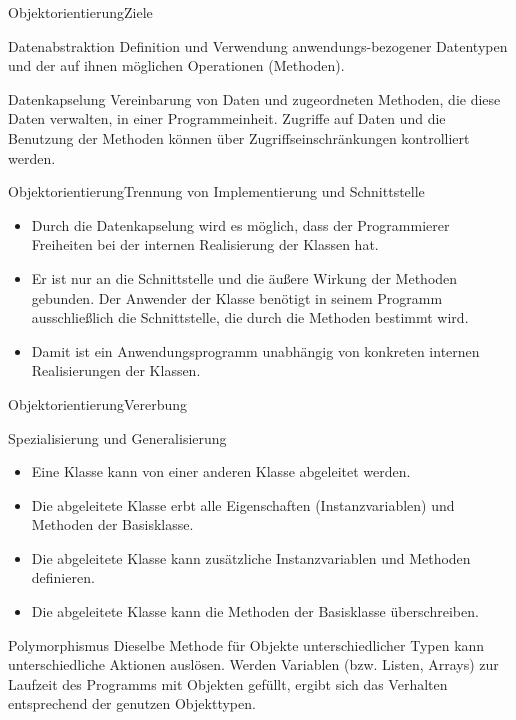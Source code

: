 \documentclass[xelatex,aspectratio=169]{beamer}
\begin{document}
\begin{frame}{Objektorientierung}{Ziele}
    \begin{block}{Datenabstraktion}
        Definition und Verwendung anwendungs-bezogener Datentypen und der auf ihnen möglichen Operationen (Methoden).
    \end{block}
    \begin{block}{Datenkapselung}
        Vereinbarung von Daten  und zugeordneten Methoden, die diese Daten verwalten, in einer Programmeinheit.
        Zugriffe auf Daten und die Benutzung der Methoden können über Zugriffseinschränkungen kontrolliert werden.
    \end{block}
\end{frame}

\begin{frame}{Objektorientierung}{Trennung von Implementierung und Schnittstelle}
    \begin{itemize}
        \item Durch die Datenkapselung wird es möglich, dass der Programmierer Freiheiten bei der internen Realisierung der Klassen hat.
        \item Er ist nur an die Schnittstelle und die äußere Wirkung der Methoden gebunden. Der Anwender der Klasse benötigt in seinem Programm ausschließlich die Schnittstelle, die durch die Methoden bestimmt wird.
        \item Damit ist ein Anwendungsprogramm unabhängig von konkreten internen Realisierungen der Klassen.
    \end{itemize}
\end{frame}

\begin{frame}{Objektorientierung}{Vererbung}
    \begin{block}{Spezialisierung und Generalisierung}
        \begin{itemize}
            \item Eine Klasse kann von einer anderen Klasse abgeleitet werden.
            \item Die abgeleitete Klasse erbt alle Eigenschaften (Instanzvariablen) und Methoden der Basisklasse.
            \item Die abgeleitete Klasse kann zusätzliche Instanzvariablen und Methoden definieren.
            \item Die abgeleitete Klasse kann die Methoden der Basisklasse überschreiben.
        \end{itemize}
    \end{block}

    \begin{block}{Polymorphismus}
        Dieselbe Methode für Objekte unterschiedlicher Typen kann unterschiedliche Aktionen auslösen. Werden Variablen (bzw. Listen, Arrays) zur Laufzeit des Programms mit Objekten gefüllt, ergibt sich das Verhalten entsprechend der genutzen Objekttypen.
    \end{block}
\end{frame}
\end{document}
